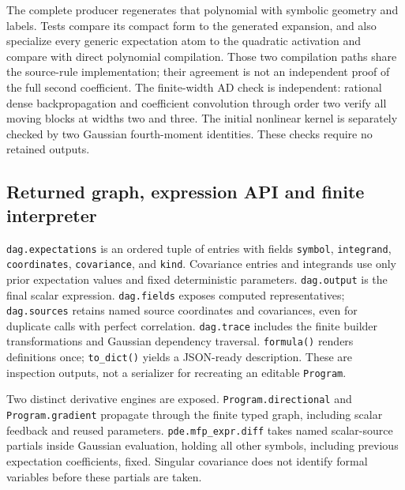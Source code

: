 \documentclass[
  11pt,
]{article}
\theoremstyle{definition}
\theoremstyle{plain}
\theoremstyle{plain}
\theoremstyle{plain}
\theoremstyle{remark}
\begin{document}
The complete producer regenerates that polynomial with symbolic geometry
and labels. Tests compare its compact form to the generated expansion,
and also specialize every generic expectation atom to the quadratic
activation and compare with direct polynomial compilation. Those two
compilation paths share the source-rule implementation; their agreement
is not an independent proof of the full second coefficient. The
finite-width AD check is independent: rational dense backpropagation and
coefficient convolution through order two verify all moving blocks at
widths two and three. The initial nonlinear kernel is separately checked
by two Gaussian fourth-moment identities. These checks require no
retained outputs.

\subsection{Returned graph, expression API and finite
interpreter}\label{returned-graph-expression-api-and-finite-interpreter}

\texttt{dag.expectations} is an ordered tuple of entries with fields
\texttt{symbol}, \texttt{integrand}, \texttt{coordinates},
\texttt{covariance}, and \texttt{kind}. Covariance entries and
integrands use only prior expectation values and fixed deterministic
parameters. \texttt{dag.output} is the final scalar expression.
\texttt{dag.fields} exposes computed representatives;
\texttt{dag.sources} retains named source coordinates and covariances,
even for duplicate calls with perfect correlation. \texttt{dag.trace}
includes the finite builder transformations and Gaussian dependency
traversal. \texttt{formula()} renders definitions once;
\texttt{to\_dict()} yields a JSON-ready description. These are
inspection outputs, not a serializer for recreating an editable
\texttt{Program}.

Two distinct derivative engines are exposed.
\texttt{Program.directional} and \texttt{Program.gradient} propagate
through the finite typed graph, including scalar feedback and reused
parameters. \texttt{pde.mfp\_expr.diff} takes named scalar-source
partials inside Gaussian evaluation, holding all other symbols,
including previous expectation coefficients, fixed. Singular covariance
does not identify formal variables before these partials are taken.
\end{document}
